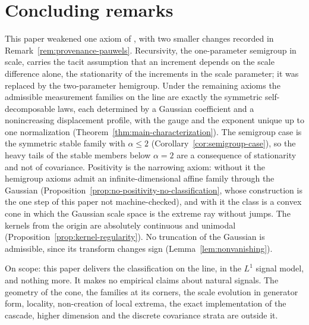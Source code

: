 
\section{Concluding remarks}\label{sec:conclusions}

This paper weakened one axiom of , with two smaller changes
recorded in Remark~\ref{rem:provenance-pauwels}. Recursivity, the one-parameter semigroup in
scale, carries the tacit assumption that an increment depends on the scale difference
alone, the stationarity of the increments in the scale parameter; it was replaced by the
two-parameter hemigroup. Under the remaining axioms
the admissible measurement families on the line are exactly the symmetric self-decomposable
laws, each determined by a Gaussian coefficient and a nonincreasing displacement profile,
with the gauge and the exponent unique up to one normalization
(Theorem~\ref{thm:main-characterization}). The semigroup case is the symmetric stable
family with $\alpha \le 2$ (Corollary~\ref{cor:semigroup-case}), so the heavy tails of the
stable members below $\alpha = 2$ are a consequence of stationarity and not of
covariance. Positivity is the narrowing axiom: without it the hemigroup axioms admit an
infinite-dimensional affine family through the Gaussian
(Proposition~\ref{prop:no-positivity-no-classification}, whose construction is the one
step of this paper not machine-checked), and with it the class is a convex cone in which the
Gaussian scale space is the extreme ray without jumps. The kernels from the origin are
absolutely continuous and unimodal (Proposition~\ref{prop:kernel-regularity}). No truncation of the
Gaussian is admissible, since its transform changes sign (Lemma~\ref{lem:nonvanishing}).

On scope: this paper delivers the classification on the line, in the $L^1$ signal model, and
nothing more. It makes no empirical claims about natural signals. The geometry of the cone,
the families at its corners, the scale evolution in generator form, locality, non-creation
of local extrema, the exact implementation of the cascade, higher dimension and the
discrete covariance strata are outside it.

